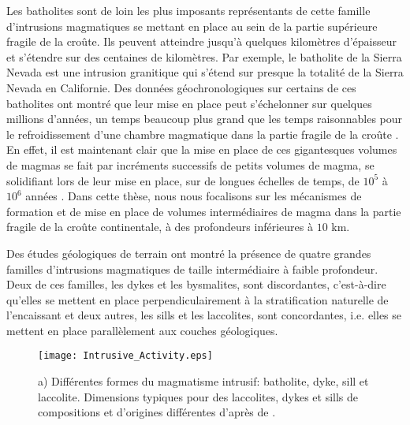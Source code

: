 Les batholites sont de loin  les plus imposants représentants de cette
famille d'intrusions  magmatiques se  mettant en place  au sein  de la
partie supérieure fragile de la  croûte. Ils peuvent atteindre jusqu'à
quelques  kilomètres d'épaisseur  et  s'étendre sur  des centaines  de
kilomètres.  Par  exemple, le  batholite de la  Sierra Nevada  est une
intrusion granitique qui s'étend sur  presque la totalité de la Sierra
Nevada en  Californie. Des  données géochronologiques sur  certains de
ces batholites ont montré que leur mise en place peut s'échelonner sur
quelques millions d'années, un temps beaucoup plus grand que les temps
raisonnables pour le refroidissement  d'une chambre magmatique dans la
partie fragile de  la croûte \citep{Glazner:2004gv}. En  effet, il est
maintenant clair que  la mise en place de ces  gigantesques volumes de
magmas se fait  par incréments successifs de petits  volumes de magma,
se solidifiant lors de leur mise  en place, sur de longues échelles de
temps,         de        $10^5$         à        $10^6$         années
\citep{Petford:2000cc,Glazner:2004gv}.   Dans cette  thèse, nous  nous
focalisons sur  les mécanismes  de formation  et de  mise en  place de
volumes intermédiaires  de magma dans  la partie fragile de  la croûte
continentale, à des profondeurs inférieures à $10$ km.

Des études géologiques de terrain ont montré la présence de quatre
grandes familles d'intrusions magmatiques de taille intermédiaire à
faible profondeur. Deux de ces familles, les dykes et les bysmalites,
sont discordantes, c'est-à-dire qu'elles se mettent en place
perpendiculairement à la stratification naturelle de l'encaissant et
deux autres, les sills et les laccolites, sont concordantes,
i.e. elles se mettent en place parallèlement aux couches géologiques.

\begin{figure}[htpb]
 \begin{center}
 \graphicspath{ {/Users/thorey/Documents/These/Manuscript/Figure/Chapter1/} }
 \texttt{[image: Intrusive\_Activity.eps]}
 \caption{a) Différentes formes du magmatisme intrusif: batholite,
 dyke, sill et laccolite. Dimensions typiques pour des
 laccolites, dykes et sills de compositions et d'origines
 différentes d'après de \citet{Cruden:tg}. }
 \label{C1-Dimension}
 \end{center}
\end{figure}

